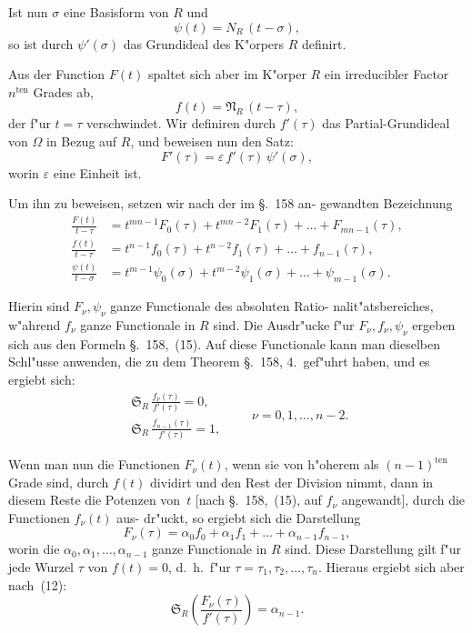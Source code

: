 \documentclass[12pt,a4paper]{article}
\theoremstyle{weber}
\begin{document}
Ist nun $\sigma$ eine Basisform von $R$ und
\[
\psi(t) = N_R\,(t-\sigma),
\]
so ist durch $\psi'(\sigma)$ das Grundideal des K"orpers $R$ definirt.

Aus der Function $F(t)$ spaltet sich aber im K"orper $R$ ein
irreducibler Factor $n^{\mathrm{ten}}$ Grades ab,
\[
f(t) = \mathfrak{N}_R\,(t-\tau),
\]
der f"ur $t = \tau$ verschwindet. Wir definiren durch $f'(\tau)$ das
Partial-Grundideal von $\varOmega$ in Bezug auf $R$, und beweisen
nun den Satz:
\begin{equation}\label{eq:s159-8}
F'(\tau) = \varepsilon\,f'(\tau)\,\psi'(\sigma),
\end{equation}
worin $\varepsilon$ eine Einheit ist.

Um ihn zu beweisen, setzen wir nach der im \S.~158 an-
gewandten Bezeichnung
\begin{align}
\frac{F(t)}{t-\tau} &= t^{mn-1}F_0(\tau) + t^{mn-2}F_1(\tau) + \dots + F_{mn-1}(\tau), \label{eq:s159-9}\\
\frac{f(t)}{t-\tau} &= t^{n-1}f_0(\tau) + t^{n-2}f_1(\tau) + \dots + f_{n-1}(\tau), \label{eq:s159-10}\\
\frac{\psi(t)}{t-\sigma} &= t^{m-1}\psi_0(\sigma) + t^{m-2}\psi_1(\sigma) + \dots + \psi_{m-1}(\sigma). \label{eq:s159-11}
\end{align}

Hierin sind $F_\nu, \psi_\nu$ ganze Functionale des absoluten Ratio-
nalit"atsbereiches, w"ahrend $f_\nu$ ganze Functionale in $R$ sind. Die
Ausdr"ucke f"ur $F_\nu, f_\nu, \psi_\nu$ ergeben sich aus den Formeln \S.~158,~(15).
Auf diese Functionale kann man dieselben Schl"usse anwenden,
die zu dem Theorem \S.~158, 4.\ gef"uhrt haben, und es ergiebt sich:
\begin{equation}\label{eq:s159-12}
\begin{gathered}
\mathfrak{S}_R\,\frac{f_\nu(\tau)}{f'(\tau)} = 0, \\
\mathfrak{S}_R\,\frac{f_{n-1}(\tau)}{f'(\tau)} = 1,
\end{gathered}
\qquad \nu = 0, 1, \dots, n-2.
\end{equation}

Wenn man nun die Functionen $F_\nu(t)$, wenn sie von h"oherem
als $(n-1)^{\mathrm{ten}}$ Grade sind, durch $f(t)$ dividirt und den Rest der
Division nimmt, dann in diesem Reste die Potenzen von~$t$ [nach
\S.~158,~(15), auf $f_\nu$ angewandt], durch die Functionen $f_\nu(t)$ aus-
dr"uckt, so ergiebt sich die Darstellung
\begin{equation}\label{eq:s159-13}
F_\nu(\tau) = \alpha_0f_0 + \alpha_1f_1 + \dots + \alpha_{n-1}f_{n-1},
\end{equation}
worin die $\alpha_0, \alpha_1, \dots, \alpha_{n-1}$ ganze Functionale in $R$ sind. Diese
Darstellung gilt f"ur jede Wurzel $\tau$ von $f(t) = 0$, d.~h.\ f"ur
$\tau = \tau_1, \tau_2, \dots, \tau_n$. Hieraus ergiebt sich aber nach~(12):
\[
\mathfrak{S}_R\left(\frac{F_\nu(\tau)}{f'(\tau)}\right) = \alpha_{n-1}.
\]
\end{document}
